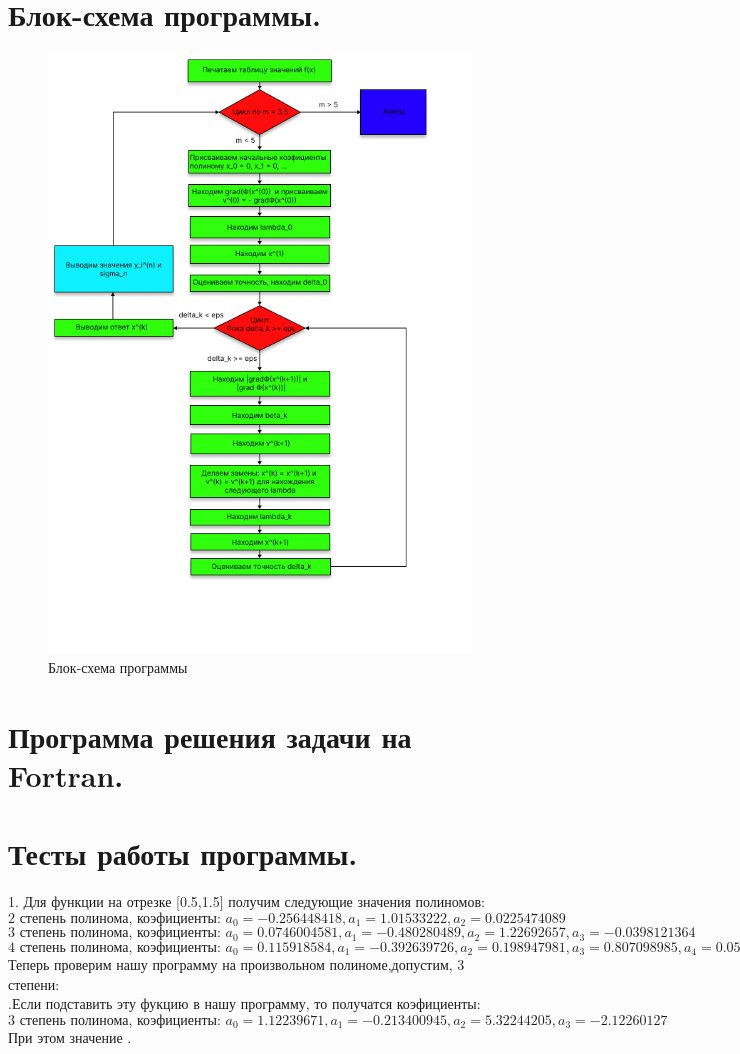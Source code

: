 \documentclass{article}
\begin{document}
\section{Блок-схема программы.}
\begin{figure}[h]
\centering
\includegraphics[height=1.1\textwidth]{algorythm.jpg}
\caption{Блок-схема программы}
\label{fig:myphoto}
\end{figure}
\newpage

\section{Программа решения задачи на Fortran.}

\newpage

\section{Тесты работы программы.}
\text{$\quad$} 1. Для функции   на отрезке [0.5,1.5] получим следующие значения полиномов:
\[\text{2 степень полинома, коэфициенты: } a_{0} = -0.256448418 , a_{1} = 1.01533222 , a_{2} = 0.0225474089 \]
\[\text{3 степень полинома, коэфициенты: } a_{0} = 0.0746004581 , a_{1} = -0.480280489 , a_{2} = 1.22692657 , a_{3} = -0.0398121364 \]
\[\text{4 степень полинома, коэфициенты: } a_{0} = 0.115918584 , a_{1} = -0.392639726 , a_{2} = 0.198947981, a_{3} = 0.807098985 , a_{4} = 0.0528342798 \] 
Теперь проверим нашу программу на произвольном полиноме,допустим, 3 степени: \\
.Если подставить эту фукцию в нашу программу, то получатся коэфициенты:
\[\text{3 степень полинома, коэфициенты: } a_{0} = 1.12239671 , a_{1} = -0.213400945 , a_{2} = 5.32244205 , a_{3} = -2.12260127 \]
При этом значение . 
\end{document}
